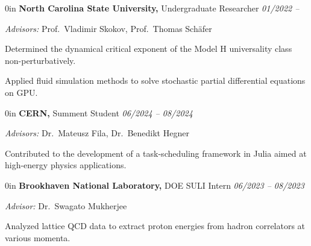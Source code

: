 \begin{adjustwidth}{\spacing}{0in}
    \textbf{North Carolina State University,} Undergraduate Researcher
    \hfill \textsl{01/2022 --}

    \textit{Advisors:} Prof.~Vladimir Skokov, Prof.~Thomas Sch\"afer
    \begin{adjustwidth}{\bullet}{\rightedge}
        Determined the dynamical critical exponent of the Model H universality
        class non-perturbatively.

        Applied fluid simulation methods to solve stochastic partial differential
        equations on GPU.
    \end{adjustwidth}
\end{adjustwidth}

\begin{adjustwidth}{\spacing}{0in}
    \textbf{CERN,} Summent Student
    \hfill \textsl{06/2024 -- 08/2024}

    \textit{Advisors:} Dr.~Mateusz Fila, Dr.~Benedikt Hegner
    \begin{adjustwidth}{\bullet}{\rightedge}
        Contributed to the development of a task-scheduling framework in Julia
        aimed at high-energy physics applications.
    \end{adjustwidth}
\end{adjustwidth}

\begin{adjustwidth}{\spacing}{0in}
    \textbf{Brookhaven National Laboratory,} DOE SULI Intern
    \hfill \textsl{06/2023 -- 08/2023}

    \textit{Advisor:} Dr.~Swagato Mukherjee
    \begin{adjustwidth}{\bullet}{\rightedge}
        Analyzed lattice QCD data to extract proton energies from hadron
        correlators at various momenta.
    \end{adjustwidth}
\end{adjustwidth}
